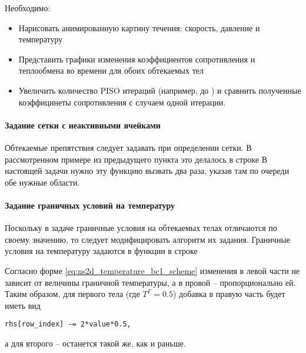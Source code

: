 Необходимо:
\begin{itemize}
\item Нарисовать анимированную картину течения: скорость, давление и температуру
\item Представить графики изменения коэффициентов сопротивления и теплообмена во времени для обоих обтекаемых тел
\item Увеличить количество PISO итераций (например, до ) и сравнить полученные коэффицинеты сопротивления с случаем одной итерации.
\end{itemize}

\paragraph{Задание сетки с неактивными ячейками}
Обтекаемые препятствия следует задавать
при определении сетки. В рассмотренном примере из предыдущего пункта
это делалось в строке
В настоящей задачи нужно эту функцию вызвать два раза, указав там по очереди обе нужные области.

\paragraph{Задание граничных условий на температуру}
Поскольку в задаче граничные условия на обтекаемых
телах отличаются по своему значению, то следует
модифицировать алгоритм их задания.
Граничные условия на температуру задаются в функции 
в строке

Согласно форме
\cref{eq:ns2d_temperature_bc1_scheme}
изменения в левой части не зависит от величины граничной температуры,
а в провой -- пропорционально ей.
Таким образом, для первого тела (где $T^\Gamma = 0.5$) добавка в правую часть будет иметь вид
\begin{verbatim}
rhs[row_index] -= 2*value*0.5,
\end{verbatim}
а для второго -- останется такой же, как и раньше.

